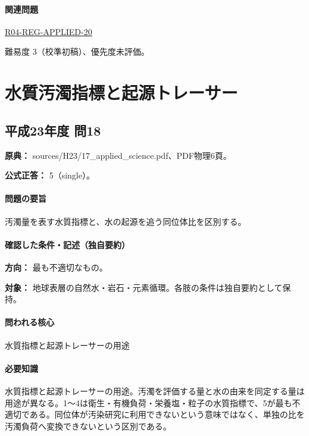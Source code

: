 \paragraph{関連問題} \hyperref[q:r04-reg-applied-20]{R04-REG-APPLIED-20}

\par 難易度 3（校準初稿）、優先度未評価。

\section{水質汚濁指標と起源トレーサー}

\subsection{平成23年度 問18}
\label{q:h23-reg-applied-18}

\noindent\textbf{原典：} sources/H23/17\_applied\_science.pdf、PDF物理6頁。

\textbf{公式正答：} 5（single）。

\paragraph{問題の要旨} 汚濁量を表す水質指標と、水の起源を追う同位体比を区別する。

\paragraph{確認した条件・記述（独自要約）}\mbox{}\par

\noindent\textbf{方向：} 最も不適切なもの。\par

\noindent\textbf{対象：} 地球表層の自然水・岩石・元素循環。各肢の条件は独自要約として保持。\par

\paragraph{問われる核心} 水質指標と起源トレーサーの用途

\paragraph{必要知識} 水質指標と起源トレーサーの用途。汚濁を評価する量と水の由来を同定する量は用途が異なる。1〜4は衛生・有機負荷・栄養塩・粒子の水質指標で、5が最も不適切である。同位体が汚染研究に利用できないという意味ではなく、単独の比を汚濁負荷へ変換できないという区別である。


